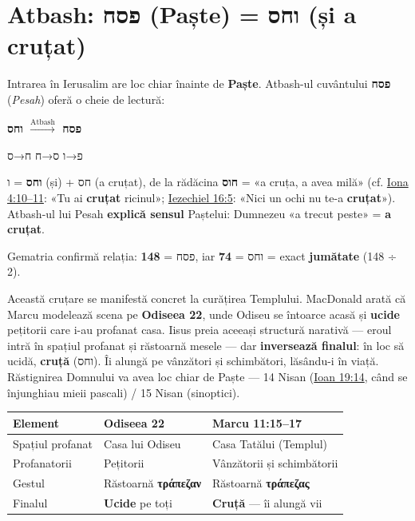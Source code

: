 \documentclass[12pt,a4paper,twoside,openany]{book}
\begin{document}
\section{Atbash: פסח (Paște) = וחס (și a cruțat)}

Intrarea în Ierusalim are loc chiar înainte de \textbf{Paște}. Atbash-ul cuvântului \textbf{פסח} (\textit{Pesah}) oferă o cheie de lectură:

\begin{center}
\large\bfseries
פסח $\xrightarrow{\text{Atbash}}$ וחס
\end{center}

\begin{center}
פ→ו \quad ס→ח \quad ח→ס
\end{center}

\textbf{וחס} = ו (și) + חס (a cruțat), de la rădăcina \textbf{חוס} = «a cruța, a avea milă» (cf. \href{https://bibliaortodoxa.ro/carte.php?id=39\&cap=4\#10}{Iona 4:10--11}: «Tu ai \textbf{cruțat} ricinul»; \href{https://bibliaortodoxa.ro/carte.php?id=33\&cap=16\#5}{Iezechiel 16:5}: «Nici un ochi nu te-a \textbf{cruțat}»). Atbash-ul lui Pesah \textbf{explică sensul} Paștelui: Dumnezeu «a trecut peste» = \textbf{a cruțat}.

Gematria confirmă relația: פסח = \textbf{148}, iar וחס = \textbf{74} = exact \textbf{jumătate} (148 ÷ 2).

Această cruțare se manifestă concret la curățirea Templului. MacDonald arată că Marcu modelează scena pe \textbf{Odiseea 22}, unde Odiseu se întoarce acasă și \textbf{ucide} pețitorii care i-au profanat casa. Iisus preia aceeași structură narativă — eroul intră în spațiul profanat și răstoarnă mesele — dar \textbf{inversează finalul}: în loc să ucidă, \textbf{cruță} (וחס). Îi alungă pe vânzători și schimbători, lăsându-i în viață. Răstignirea Domnului va avea loc chiar de Paște — 14 Nisan (\href{https://bibliaortodoxa.ro/carte.php?id=35\&cap=19\#14}{Ioan 19:14}, când se înjunghiau mieii pascali) / 15 Nisan (sinoptici).

\begin{center}
\small
\begin{tabularx}{\textwidth}{L{3cm}L{5.5cm}X}
\toprule
{}
\textbf{Element} & \textbf{Odiseea 22} & \textbf{Marcu 11:15--17} \\
\midrule
Spațiul profanat & Casa lui Odiseu & Casa Tatălui (Templul) \\
Profanatorii & Pețitorii & Vânzătorii și schimbătorii \\
Gestul & Răstoarnă \textbf{τράπεζαν} & Răstoarnă \textbf{τράπεζας} \\
Finalul & \textbf{Ucide} pe toți & \textbf{Cruță} — îi alungă vii \\
\bottomrule
\end{tabularx}
\end{center}
\end{document}
